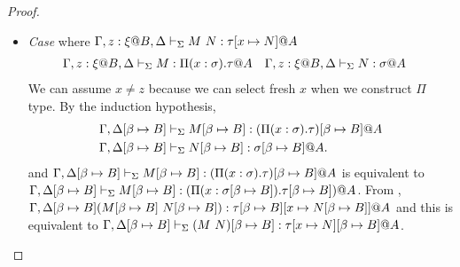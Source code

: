 \begin{proof}
\begin{itemize}
    \item[] \textit{Case} \TApp{} where \( \G, z:\xi@B, \D \V M\ N:\tau[x\mapsto N]@A \)
		  \begin{align*}
			  & \G, z:\xi@B, \D \V M:\Pi(x:\sigma).\tau@A && \G, z:\xi@B, \D \V N:\sigma@A
		  \end{align*}
		  We can assume $x \neq z$ because we can select fresh $x$ when we construct $\Pi$ type.
		  By the induction hypothesis,
		  \begin{align*}
			& \G, \D\SB \V M\SB: (\Pi(x:\sigma).\tau)\SB@A \\
			& \G,\D\SB\V N\SB: \sigma\SB@A.
		  \end{align*}
		  and \(\G, \D\SB \V M\SB: (\Pi(x:\sigma).\tau)\SB@A\) is equivalent to \( \Gamma, \Delta[\beta \mapsto B] \vdash_\Sigma M[\beta \mapsto B]: (\Pi(x:\sigma[\beta \mapsto B]).\tau[\beta \mapsto B])@A \).
		  From \TApp, \(\Gamma,\Delta[\beta \mapsto B] (M[\beta \mapsto B]\ N[\beta \mapsto B]): \tau[\beta \mapsto B][x \mapsto N[\beta \mapsto B]]@A\) and this is equivalent to
	      \(\G,\D\SB \V (M\ N)\SB: \tau[x \mapsto N]\SB@A\).
	\end{itemize}
\end{proof}


